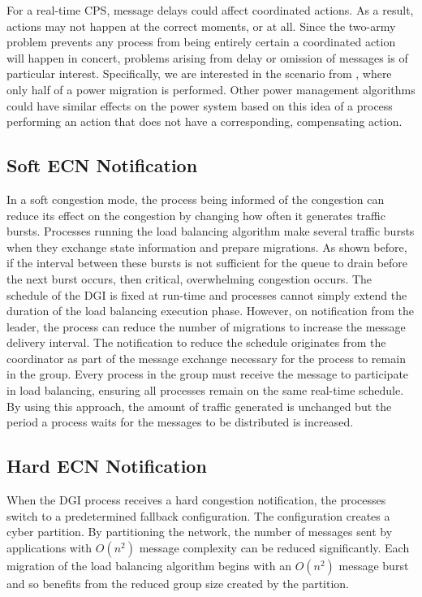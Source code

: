 For a real-time \ac{CPS}, message delays could affect coordinated actions.
As a result, actions may not happen at the correct moments, or at all.
Since the two-army problem prevents any process from being entirely certain a coordinated action will happen in concert, problems arising from delay or omission of messages is of particular interest.
Specifically, we are interested in the scenario from \cite{HARINI}, where only half of a power migration is performed.
Other power management algorithms could have similar effects on the power system based on this idea of a process performing an action that does not have a corresponding, compensating action.

\subsection{Soft ECN Notification}

In a soft congestion mode, the process being informed of the congestion can reduce its effect on the congestion by changing how often it generates traffic bursts.
Processes running the load balancing algorithm make several traffic bursts when they exchange state information and prepare migrations.
As shown before, if the interval between these bursts is not sufficient for the queue to drain before the next burst occurs, then critical, overwhelming congestion occurs.
The schedule of the \ac{DGI} is fixed at run-time and processes cannot simply extend the duration of the load balancing execution phase.
However, on notification from the leader, the process can reduce the number of migrations to increase the message delivery interval.
The notification to reduce the schedule originates from the coordinator as part of the message exchange necessary for the process to remain in the group.
Every process in the group must receive the message to participate in load balancing, ensuring all processes remain on the same real-time schedule.
By using this approach, the amount of traffic generated is unchanged but the period a process waits for the messages to be distributed is increased.

\subsection{Hard ECN Notification}

When the \ac{DGI} process receives a hard congestion notification, the processes switch to a predetermined fallback configuration.
The configuration creates a cyber partition.
By partitioning the network, the number of messages sent by applications with $O(n^2)$ message complexity can be reduced significantly.
Each migration of the load balancing algorithm begins with an $O(n^2)$ message burst and so benefits from the reduced group size created by the partition.

